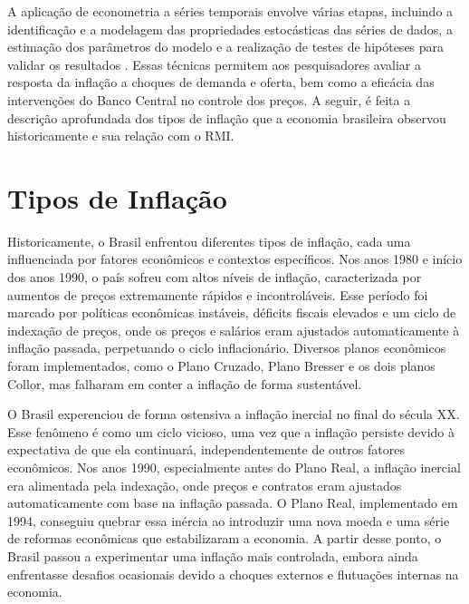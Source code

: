 \documentclass[12pt,oneside,a4paper,chapter=TITLE,english,brazil,sumario=abnt-6027-2012]{abntex2}
\begin{document}
A aplicação de econometria a séries temporais envolve várias etapas, incluindo a identificação e a modelagem das propriedades estocásticas das séries de dados, a estimação dos parâmetros do modelo e a realização de testes de hipóteses para validar os resultados \cite{stock_2020_introduction}. Essas técnicas permitem aos pesquisadores avaliar a resposta da inflação a choques de demanda e oferta, bem como a eficácia das intervenções do Banco Central no controle dos preços. A seguir, é feita a descrição aprofundada dos tipos de inflação que a economia brasileira observou historicamente e sua relação com o RMI.

\chapter{Tipos de Inflação}


Historicamente, o Brasil enfrentou diferentes tipos de inflação, cada uma influenciada por fatores econômicos e contextos específicos. Nos anos 1980 e início dos anos 1990, o país sofreu com altos níveis de inflação, caracterizada por aumentos de preços extremamente rápidos e incontroláveis. Esse período foi marcado por políticas econômicas instáveis, déficits fiscais elevados e um ciclo de indexação de preços, onde os preços e salários eram ajustados automaticamente à inflação passada, perpetuando o ciclo inflacionário. Diversos planos econômicos foram implementados, como o Plano Cruzado, Plano Bresser e os dois planos Collor, mas falharam em conter a inflação de forma sustentável.

O Brasil experenciou de forma ostensiva a inflação inercial no final do sécula XX. Esse fenômeno é como um ciclo vicioso, uma vez que a inflação persiste devido à expectativa de que ela continuará, independentemente de outros fatores econômicos. Nos anos 1990, especialmente antes do Plano Real, a inflação inercial era alimentada pela indexação, onde preços e contratos eram ajustados automaticamente com base na inflação passada. O Plano Real, implementado em 1994, conseguiu quebrar essa inércia ao introduzir uma nova moeda e uma série de reformas econômicas que estabilizaram a economia. A partir desse ponto, o Brasil passou a experimentar uma inflação mais controlada, embora ainda enfrentasse desafios ocasionais devido a choques externos e flutuações internas na economia.
\end{document}

